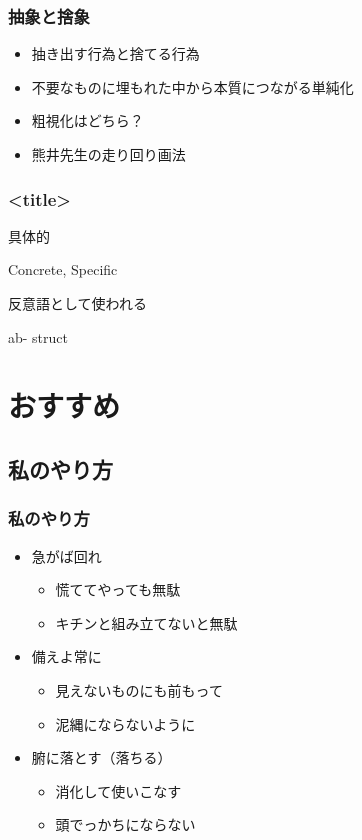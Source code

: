 \documentclass[12pt, dvipdfmx]{beamer}
\begin{document}
\begin{frame}
    \frametitle{抽象と捨象}
    \begin{itemize}
        \item 抽き出す行為と捨てる行為
        \item 不要なものに埋もれた中から本質につながる単純化
        \item 粗視化はどちら？
        \item 熊井先生の走り回り画法
    \end{itemize}
\end{frame}


\begin{frame}
    \frametitle{<title>}

    具体的

    Concrete, Specific


    反意語として使われる

    ab-
    struct


\end{frame}
\section{おすすめ}

\subsection{私のやり方}
\begin{frame}
    \frametitle{私のやり方}
        \begin{itemize}
            \LARGE
            \item 急がば回れ
            \begin{itemize}
                \Large
                \item<2-> 慌ててやっても無駄
                \item<2-> キチンと組み立てないと無駄
            \end{itemize}
            \item 備えよ常に
            \begin{itemize}
                \Large
                \item<3-> 見えないものにも前もって
                \item<3-> 泥縄にならないように
            \end{itemize}
            \item 腑に落とす（落ちる）
            \begin{itemize}
                \Large
                \item<4> 消化して使いこなす
                \item<4> 頭でっかちにならない
            \end{itemize}
        \end{itemize}
\end{frame}
\end{document}
